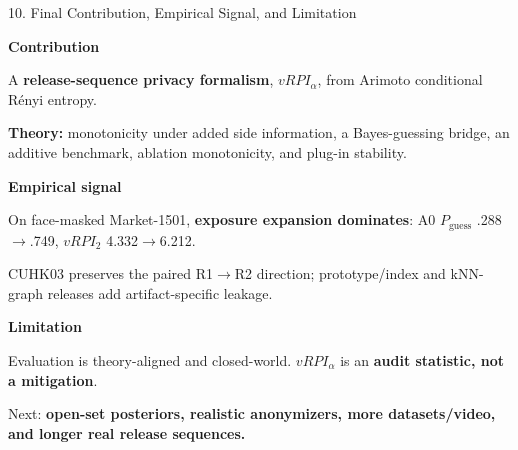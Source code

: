 \documentclass[final]{article}
\newcommand{\fsHone}{\fontsize{40}{47}}   %
\newcommand{\fsBody}{\fontsize{25}{29}}   %
\begin{document}
\begin{minipage}[t]{\textwidth}
\vspace{0.04in}
\begin{sectionbox}{10. Final Contribution, Empirical Signal, and Limitation}
\begin{minipage}[t]{0.318\linewidth}
\begin{tcolorbox}[colback=lightblue,colframe=navy2,left=0.168in,right=0.168in,top=0.144in,bottom=0.12in]
{\fsHone\bfseries\color{navy}Contribution}\par\vspace{0.05in}
{\fsBody\selectfont
A \textbf{release-sequence privacy formalism}, $vRPI_\alpha$, from Arimoto conditional Rényi entropy.\par\vspace{0.07in}
\textbf{Theory:} monotonicity under added side information, a Bayes-guessing bridge, an additive benchmark, ablation monotonicity, and plug-in stability.}
\end{tcolorbox}
\end{minipage}\hfill
\begin{minipage}[t]{0.318\linewidth}
\begin{tcolorbox}[colback=softgreen,colframe=green,left=0.168in,right=0.168in,top=0.144in,bottom=0.12in]
{\fsHone\bfseries\color{navy}Empirical signal}\par\vspace{0.05in}
{\fsBody\selectfont
On face-masked Market-1501, \textbf{exposure expansion dominates}: A0 $P_{\mathrm{guess}}$ .288$\rightarrow$.749, $vRPI_2$ 4.332$\rightarrow$6.212.\par\vspace{0.07in}
CUHK03 preserves the paired R1$\rightarrow$R2 direction; prototype/index and kNN-graph releases add artifact-specific leakage.}
\end{tcolorbox}
\end{minipage}\hfill
\begin{minipage}[t]{0.318\linewidth}
\begin{tcolorbox}[colback=softorange,colframe=orange,left=0.168in,right=0.168in,top=0.144in,bottom=0.12in]
{\fsHone\bfseries\color{navy}Limitation}\par\vspace{0.05in}
{\fsBody\selectfont
Evaluation is theory-aligned and closed-world. $vRPI_\alpha$ is an \textbf{audit statistic, not a mitigation}.\par\vspace{0.07in}
Next: \textbf{open-set posteriors, realistic anonymizers, more datasets/video, and longer real release sequences.}}
\end{tcolorbox}
\end{minipage}
\end{sectionbox}


\end{minipage}
\end{document}
